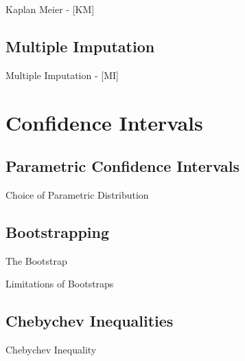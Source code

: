 \documentclass{beamer}
\begin{document}
\begin{frame}{Kaplan Meier - [KM] }

\end{frame}

\subsection{Multiple Imputation}

\begin{frame}{Multiple Imputation - [MI] }

\end{frame}



\section{Confidence Intervals}

\subsection{Parametric Confidence Intervals}

\begin{frame}{Choice of Parametric Distribution}

\end{frame}


\subsection{Bootstrapping}

\begin{frame}{The Bootstrap}

\end{frame}
 
\begin{frame}{Limitations of Bootstraps}

\end{frame}

\subsection{Chebychev Inequalities}

\begin{frame}{Chebychev Inequality}

\end{frame}
\end{document}
